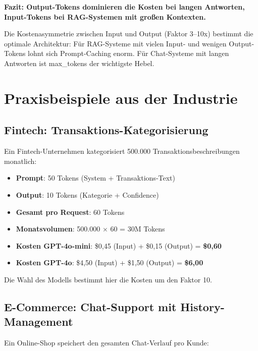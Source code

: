 \textbf{Fazit: Output-Tokens dominieren die Kosten bei langen Antworten, Input-Tokens bei RAG-Systemen mit großen Kontexten.}

\begin{praxishinweis}
Die Kostenasymmetrie zwischen Input und Output (Faktor 3--10x) bestimmt die optimale Architektur: Für RAG-Systeme mit vielen Input- und wenigen Output-Tokens lohnt sich Prompt-Caching enorm. Für Chat-Systeme mit langen Antworten ist max\_tokens der wichtigste Hebel.
\end{praxishinweis}

\section{Praxisbeispiele aus der Industrie}

\subsection{Fintech: Transaktions-Kategorisierung}

Ein Fintech-Unternehmen kategorisiert 500.000 Transaktionsbeschreibungen monatlich:

\begin{itemize}[leftmargin=*]
    \item \textbf{Prompt}: 50 Tokens (System + Transaktions-Text)
    \item \textbf{Output}: 10 Tokens (Kategorie + Confidence)
    \item \textbf{Gesamt pro Request}: 60 Tokens
    \item \textbf{Monatsvolumen}: 500.000 $\times$ 60 = 30M Tokens
    \item \textbf{Kosten GPT-4o-mini}: \$0,45 (Input) + \$0,15 (Output) = \textbf{\$0,60}
    \item \textbf{Kosten GPT-4o}: \$4,50 (Input) + \$1,50 (Output) = \textbf{\$6,00}
\end{itemize}

Die Wahl des Modells bestimmt hier die Kosten um den Faktor 10.

\subsection{E-Commerce: Chat-Support mit History-Management}

Ein Online-Shop speichert den gesamten Chat-Verlauf pro Kunde:

